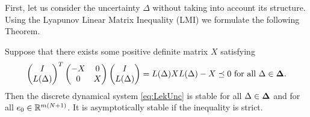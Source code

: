 First, let us consider the uncertainty $\Delta$ without taking into account its structure. 
Using the Lyapunov Linear Matrix Inequality (LMI) we formulate the following Theorem. 
\begin{theo}
	\label{thm:Lyap}
	Suppose that there exists some positive definite matrix $X$ satisfying 
	\begin{align}
	\label{eq:Lyap}
	\begin{pmatrix}
	I \\ L(\Delta) 
	\end{pmatrix}^T
	\begin{pmatrix}
	-X & 0 \\ 0 & X
	\end{pmatrix}
	\begin{pmatrix}
	I \\ L(\Delta) 
	\end{pmatrix} = L(\Delta)X L(\Delta) - X \preceq 0 \text{ for all } \Delta \in \mathbf{\Delta}.
	\end{align}
	Then the discrete dynamical system \eqref{eq:LekUnc} 
	is stable for all $\Delta \in \mathbf{\Delta}$ and for all $e_0 \in {\mathbb{R}}^{m ( N+1)}$.
	It is asymptotically stable if the inequality is strict. 
\end{theo}
